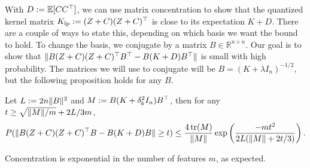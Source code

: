 With $D := \mathbb{E}[C C^\top]$, we can use matrix concentration to show that the
quantized kernel matrix $K_\mathrm{lp} := (Z + C)(Z + C)^\top$ is close to its
expectation $K + D$.
There are a couple of ways to state this, depending on which basis we want the
bound to hold.
To change the basis, we conjugate by a matrix $B \in \mathbb{R}^{n \times n}$.
Our goal is to show that $\|B (Z + C)(Z + C)^\top B^\top - B(K + D)B^\top\|$ is small
with high probability.
The matrices we will use to conjugate will be $B = (K + \lambda I_n)^{-1/2}$, but the
following proposition holds for any $B$.

\begin{proposition}
  Let $L := 2n \|B\|^2$ and $M := B(K + \delta^2_b I_n) B^\top$,
  then for any $t \geq \sqrt{\|M\| / m} + 2L/3m$,
  \begin{equation*}
    P(\|B(Z + C)(Z + C)^\top B - B(K + D)B\| \geq t) \leq \frac{4\mathop{\rm tr}(M)}{\|M\|}
    \exp \left( \frac{-mt^2}{2L(\|M\| + 2t/3)} \right).
  \end{equation*}
  \label{prop:quantized_concentration}
\end{proposition}
Concentration is exponential in the number of features $m$, as expected.

